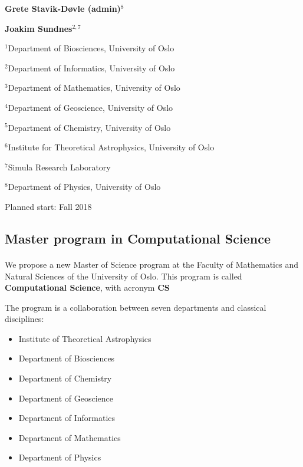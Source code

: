 \documentclass[%
oneside,                 %
final,                   %
10pt]{article}
\begin{document}
\begin{center}
{\bf Grete Stavik-Døvle (admin)${}^{8}$} \\ [0mm]
\end{center}


\begin{center}
{\bf Joakim Sundnes${}^{2, 7}$} \\ [0mm]
\end{center}

\begin{center}
\centerline{{\small ${}^1$Department of Biosciences, University of Oslo}}
\centerline{{\small ${}^2$Department of Informatics, University of Oslo}}
\centerline{{\small ${}^3$Department of Mathematics, University of Oslo}}
\centerline{{\small ${}^4$Department of Geoscience, University of Oslo}}
\centerline{{\small ${}^5$Department of Chemistry, University of Oslo}}
\centerline{{\small ${}^6$Institute for Theoretical Astrophysics, University of Oslo}}
\centerline{{\small ${}^7$Simula Research Laboratory}}
\centerline{{\small ${}^8$Department of Physics, University of Oslo}}
\end{center}
    


\begin{center}
Planned start: Fall 2018
\end{center}

\vspace{1cm}


\subsection{Master program in Computational Science}

\paragraph{}
We propose a new Master of Science program at the Faculty of Mathematics and Natural Sciences of the University of Oslo. This program is called  \textbf{Computational Science}, with acronym  \textbf{CS}

The program is a collaboration between seven departments and classical disciplines:

\begin{itemize}
 \item Institute of Theoretical Astrophysics

 \item Department of Biosciences

 \item Department of Chemistry

 \item Department of Geoscience

 \item Department of Informatics

 \item Department of Mathematics

 \item Department of Physics
\end{itemize}
\end{document}
